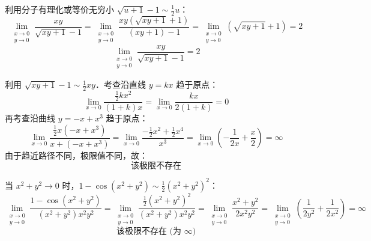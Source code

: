 \begin{solution}
    利用分子有理化或等价无穷小 $\sqrt{u+1}-1 \sim \frac{1}{2}u$：
    \begin{equation}
        \lim_{\substack{x \to 0 \\ y \to 0}} \frac{xy}{\sqrt{xy+1}-1} = \lim_{\substack{x \to 0 \\ y \to 0}} \frac{xy(\sqrt{xy+1}+1)}{(xy+1)-1} = \lim_{\substack{x \to 0 \\ y \to 0}} (\sqrt{xy+1}+1) = 2
    \end{equation}
    \begin{equation}
        \boxed{\lim_{\substack{x \to 0 \\ y \to 0}} \frac{xy}{\sqrt{xy+1}-1} = 2}
    \end{equation}

    利用 $\sqrt{xy+1}-1 \sim \frac{1}{2}xy$．考查沿直线 $y = kx$ 趋于原点：
    \begin{equation}
        \lim_{x \to 0} \frac{\frac{1}{2}kx^2}{(1+k)x} = \lim_{x \to 0} \frac{kx}{2(1+k)} = 0
    \end{equation}
    再考查沿曲线 $y = -x + x^3$ 趋于原点：
    \begin{equation}
        \lim_{x \to 0} \frac{\frac{1}{2}x(-x+x^3)}{x+(-x+x^3)} = \lim_{x \to 0} \frac{-\frac{1}{2}x^2 + \frac{1}{2}x^4}{x^3} = \lim_{x \to 0} \left( -\frac{1}{2x} + \frac{x}{2} \right) = \infty
    \end{equation}
    由于趋近路径不同，极限值不同，故：
    \begin{equation}
        \boxed{\text{该极限不存在}}
    \end{equation}

    当 $x^2 + y^2 \to 0$ 时，$1 - \cos(x^2+y^2) \sim \frac{1}{2}(x^2+y^2)^2$：
    \begin{equation}
        \lim_{\substack{x \to 0 \\ y \to 0}} \frac{1-\cos(x^2+y^2)}{(x^2+y^2)x^2y^2} = \lim_{\substack{x \to 0 \\ y \to 0}} \frac{\frac{1}{2}(x^2+y^2)^2}{(x^2+y^2)x^2y^2} = \lim_{\substack{x \to 0 \\ y \to 0}} \frac{x^2+y^2}{2x^2y^2} = \lim_{\substack{x \to 0 \\ y \to 0}} \left( \frac{1}{2y^2} + \frac{1}{2x^2} \right) = \infty
    \end{equation}
    \begin{equation}
        \boxed{\text{该极限不存在 (为 } \infty \text{)}}
    \end{equation}


\end{solution}
